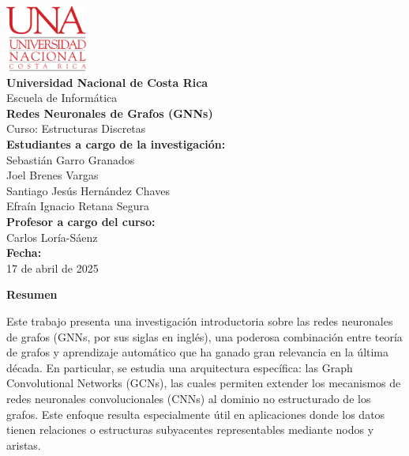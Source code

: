 \documentclass[11pt]{article} %
\begin{document}
\begin{titlepage}
    \thispagestyle{empty}
    \begin{spacing}{1.5}
    \begin{center}
        \includegraphics[width=0.2\textwidth]{Images/LogoUNA.svg.png} \\[30pt]
        {\Large \textbf{Universidad Nacional de Costa Rica}} \\[20pt] 
        {\Large Escuela de Informática} \\[20pt]
        {\Large \textbf{Redes Neuronales de Grafos (GNNs)}} \\[20pt]
        {\Large Curso: Estructuras Discretas} \\[20pt]
        {\Large \textbf{Estudiantes a cargo de la investigación:}} \\[10pt]
        {\large Sebastián Garro Granados \\ Joel Brenes Vargas \\ Santiago Jesús Hernández Chaves \\ Efraín Ignacio Retana Segura} \\[20pt]
        {\Large \textbf{Profesor a cargo del curso:}} \\[15pt]
        {\large Carlos Loría-Sáenz} \\[120pt]
        {\Large \textbf{Fecha:}} \\[15pt]
        {\large 17 de abril de 2025}
    \end{center}
    \end{spacing}
\end{titlepage}

\newpage
{\large \textbf{Resumen}}  
\vspace{5pt}

Este trabajo presenta una investigación introductoria sobre las redes neuronales de grafos (GNNs, por sus siglas en inglés), una poderosa combinación entre teoría de grafos y aprendizaje automático que ha ganado gran relevancia en la última década. En particular, se estudia una arquitectura específica: las Graph Convolutional Networks (GCNs), las cuales permiten extender los mecanismos de redes neuronales convolucionales (CNNs) al dominio no estructurado de los grafos. Este enfoque resulta especialmente útil en aplicaciones donde los datos tienen relaciones o estructuras subyacentes representables mediante nodos y aristas.
\end{document}
